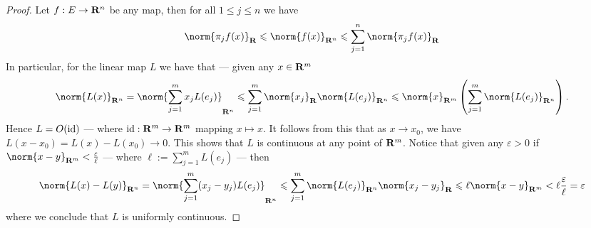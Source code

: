 \begin{proof}
  Let \(f: E \to \mathbf{R}^n\) be any map, then for all \(1 \leq j \leq n\) we have
  \[
    \norm{\pi_j  f(x)}_\R \leq \norm{f(x)}_{\R^n} \leq \sum_{j=1}^n
    \norm{\pi_j  f(x)}_\R
  \]
  In particular, for the linear map \(L\) we have that --- given any \(x \in
  \mathbf{R}^m\)
  \[
    \norm{L(x)}_{\R^n} = \norm{\sum_{j=1}^m x_j L(e_j)}_{\R^n}
    \leq \sum_{j=1}^m \norm{x_j}_\R \norm{L(e_j)}_{\R^n}
    \leq \norm{x}_{\R^m} \left( \sum_{j=1}^m \norm{L(e_j)}_{\R^n} \right).
  \]
  Hence \(L = O(\operatorname{id})\) --- where \(\operatorname{id}: \mathbf{R}^m \to \mathbf{R}^m\) mapping \(x \mapsto x\). It
  follows from this that as \(x \to x_0\), we have \(L(x - x_0) = L(x) - L(x_0) \to
  0\). This shows that \(L\) is continuous at any point of \(\mathbf{R}^m\). Notice that
  given any \(\varepsilon > 0\) if \(\norm{x - y}_{\R^m} < \frac \varepsilon \ell\) --- where \(\ell :=
  \sum_{j=1}^m L(e_j)\) --- then
  \[
    \norm{L(x) - L(y)}_{\R^n} = \norm{\sum_{j=1}^m (x_j - y_j) L(e_j) }_{\R^n}
    \leq \sum_{j=1}^m \norm{L(e_j)}_{\R^n} \norm{x_j - y_j}_\R
    \leq \ell \norm{x - y}_{\R^m}
    < \ell \frac \varepsilon \ell = \varepsilon
  \]
  where we conclude that \(L\) is uniformly continuous.
\end{proof}
